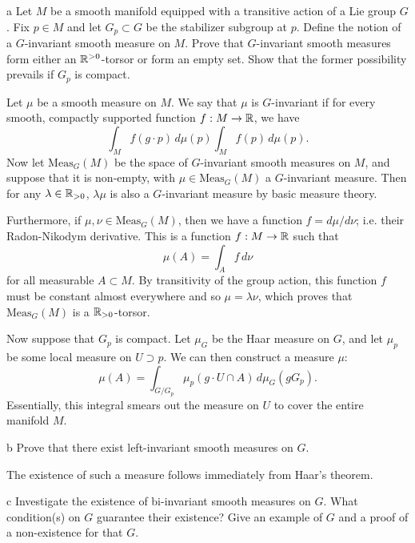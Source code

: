 \documentclass{pset}
\begin{document}
\begin{parts}
  \begin{part}{a}
    Let $M$ be a smooth manifold equipped with a transitive action of a Lie group $G$. Fix $p\in M$ and let $G_p \subset G$ be the stabilizer subgroup at $p$. Define the notion of a $G$-invariant smooth measure on $M$. Prove that $G$-invariant smooth measures form either an $\mathbb{R}^{>0}$-torsor or form an empty set. Show that the former possibility prevails if $G_p$ is compact.
  \end{part}

  Let $\mu$ be a smooth measure on $M$. We say that $\mu$ is $G$-invariant if for every smooth, compactly supported function $f : M \to \mathbb{R}$, we have
  \[
    \int_M f(g\cdot p)\,d\mu(p)  \int_M f(p)\,d\mu(p).
  \]
  Now let $\textrm{Meas}_G(M)$ be the space of $G$-invariant smooth measures on $M$, and suppose that it is non-empty, with $\mu\in \textrm{Meas}_G(M)$ a $G$-invariant measure. Then for any $\lambda\in \mathbb{R}_{>0}$, $\lambda \mu$ is also a $G$-invariant measure by basic measure theory.

  Furthermore, if $\mu, \nu\in \textrm{Meas}_G(M)$, then we have a function $f=d\mu/d\nu$; i.e. their Radon-Nikodym derivative. This is a function $f : M \to \mathbb{R}$ such that 
  \[
    \mu(A) = \int_A f\,d\nu
  \]
  for all measurable $A\subset M$. By transitivity of the group action, this function $f$ must be constant almost everywhere and so $\mu=\lambda \nu$, which proves that $\textrm{Meas}_G(M)$ is a $\mathbb{R}_{>0}$-torsor.

  Now suppose that $G_p$ is compact. Let $\mu_G$ be the Haar measure on $G$, and let $\mu_p$ be some local measure on $U \supset p$. We can then construct a measure $\mu$: 
  \[
    \mu(A) = \int_{G/G_p} \mu_p(g\cdot U \cap A)\, d\mu_G(gG_p).
  \]
  Essentially, this integral smears out the measure on $U$ to cover the entire manifold $M$.

  \begin{part}{b}
    Prove that there exist left-invariant smooth measures on $G$.
  \end{part}

  The existence of such a measure follows immediately from Haar's theorem.

  \begin{part}{c}
    Investigate the existence of bi-invariant smooth measures on $G$. What condition(s) on $G$ guarantee their existence? Give an example of $G$ and a proof of a non-existence for that $G$.
  \end{part}
\end{parts}
\end{document}
